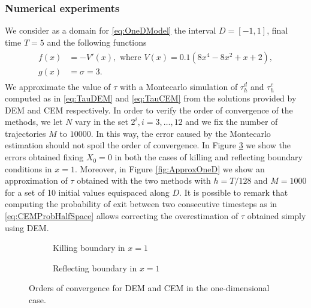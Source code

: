 \subsubsection{Numerical experiments}
We consider as a domain for \eqref{eq:OneDModel} the interval $D = \left[-1,1\right]$, final time $T = 5$ and the following functions
\begin{align}\label{eq:FunctionsOneD}
\begin{split}
	f(x) &= -V'(x), \text{ where } V(x) = 0.1(8x^4 - 8x^2 + x + 2), \\
	g(x) &= \sigma = 3.
\end{split}
\end{align}
We approximate the value of $\tau$ with a Montecarlo simulation of $\tau_h^d$ and $\tau_h^c$ computed as in \eqref{eq:TauDEM} and \eqref{eq:TauCEM} from the solutions provided by DEM and CEM respectively. In order to verify the order of convergence of the methods, we let $N$ vary in the set $2^i,i=3,\dots,12$ and we fix the number of trajectories $M$ to $10000$. In this way, the error caused by the Montecarlo estimation should not spoil the order of convergence. In Figure \ref{fig:OrdersOneD} we show the errors obtained fixing $X_0 = 0$ in both the cases of killing and reflecting boundary conditions in $x = 1$. Moreover, in Figure \ref{fig:ApproxOneD} we show an approximation of $\tau$ obtained with the two methods with $h = T/128$ and $M = 1000$ for a set of 10 initial values equispaced along $D$. It is possible to remark that computing the probability of exit between two consecutive timesteps as in \eqref{eq:CEMProbHalfSpace} allows correcting the overestimation of $\tau$ obtained simply using DEM.
\begin{figure}[t]
    \centering
    \begin{subfigure}{0.49\linewidth}
        \centering
        \resizebox{1\linewidth}{!}{ }  
        \caption{Killing boundary in $x = 1$}
        \label{fig:KillOneD}
    \end{subfigure}
    \begin{subfigure}{0.49\linewidth}
        \centering
        \resizebox{1\linewidth}{!}{ }  
        \caption{Reflecting boundary in $x = 1$}
        \label{fig:ReflectOneD}
    \end{subfigure}    
    \caption{Orders of convergence for DEM and CEM in the one-dimensional case.}
    \label{fig:OrdersOneD}
\end{figure}

